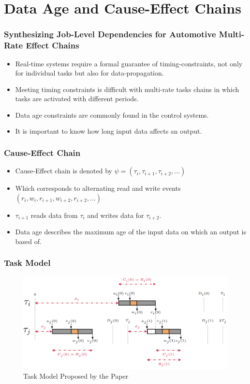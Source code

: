 \documentclass{beamer}
\begin{document}
\section{Data Age and Cause-Effect Chains}
\begin{frame}
    \frametitle{Synthesizing Job-Level Dependencies for Automotive
    Multi-Rate Effect Chains}
    \begin{itemize}
        \item Real-time systems require a formal guarantee of
            timing-constraints, not only for individual tasks but also
            for data-propagation.
        \item Meeting timing constraints is difficult with multi-rate tasks
            chains in which tasks are activated with different periods.
        \item Data age constraints are commonly found in the control systems.
        \item It is important to know how long input data affects an output.
    \end{itemize}
\end{frame}
\begin{frame}
    \frametitle{Cause-Effect Chain}
    \begin{itemize}
        \item Cause-Effect chain is denoted by $\psi = (\tau_i, \tau_{i+1}, \tau_{i+2}, ...)$
        \item Which corresponds to alternating read and write events $(r_i, w_i, r_{i+1}, w_{i+2}, r_{i+2}, ...)$
        \item $\tau_{i+1}$ reads data from $\tau_{i}$ and writes data for $\tau_{i+2}$.
        \item Data age describes the maximum age of the input data on which an
            output is based of.
    \end{itemize}
\end{frame}
\begin{frame}
    \frametitle{Task Model}
    \begin{figure}
        \centering
        \includegraphics[width=0.95\columnwidth]{tm.png}
        \caption{Task Model Proposed by the Paper}
        \label{fig:tm}
    \end{figure}
\end{frame}
\end{document}

